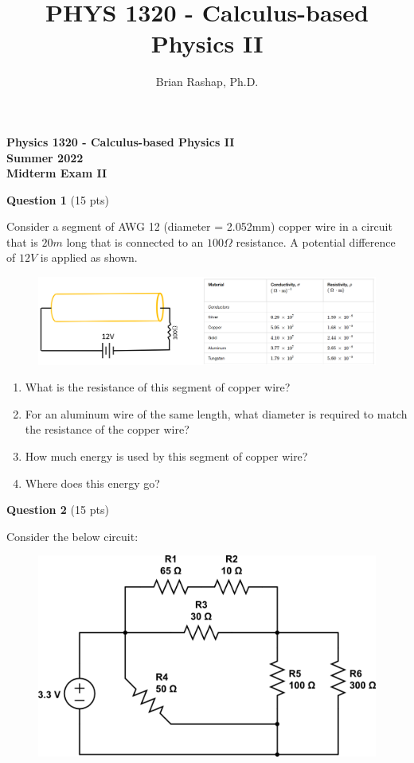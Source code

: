 \documentclass[14pt]{report}
\author{Brian Rashap, Ph.D.}
\title{PHYS 1320 - Calculus-based Physics II}
\begin{document}
\begin{center}
\textbf{Physics 1320 - Calculus-based Physics II \\ Summer 2022 \\ Midterm Exam II}
\end{center}

\textbf{Question 1} (15 pts)

Consider a segment of AWG 12 (diameter = 2.052mm) copper wire in a circuit that is $20m$ long that is connected to an $100 \Omega$ resistance. A potential difference of $12V$ is applied as shown.

\begin{figure}[H]
\begin{center}
\includegraphics[scale=0.38]{exam2_1.png}
\end{center}
\end{figure}

\begin{enumerate}[label=\Alph*]
\item What is the resistance of this segment of copper wire?
\item For an aluminum wire of the same length, what diameter is required to match the resistance of the copper wire?
\item How much energy is used by this segment of copper wire?
\item Where does this energy go?
\end{enumerate}

\textbf{Question 2} (15 pts)

Consider the below circuit:

\begin{figure}[H]
\begin{center}
\includegraphics[scale=0.40]{circuit_2_2.png}
\end{center}
\end{figure}
\end{document}
